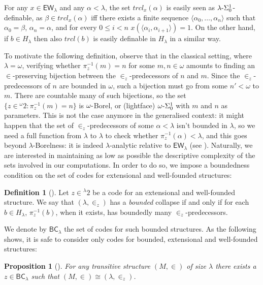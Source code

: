 \documentclass{amsart}
\numberwithin{equation}{section}
\def\hyp{{\hbox{-}}}
\newtheorem{proposition}[theorem]{Proposition}
\theoremstyle{definition}
\newtheorem{definition}[theorem]{Definition}
\theoremstyle{remark}
\begin{document}
For any $x\in\mathsf{EW}_\lambda$ and any $\alpha<\lambda$, the set $trcl_x(\alpha)$ is easily seen as $\lambda\hyp\Sigma^1_0$-definable, as $\beta\in trcl_x(\alpha)$ iff there exists a finite sequence $\langle\alpha_0,\dots,\alpha_n\rangle$ such that $\alpha_0=\beta$, $\alpha_n=\alpha$, and for every $0\leq i<n$ $x(\langle\alpha_i,\alpha_{i+1}\rangle)=1$. On the other hand, if $b\in H_\lambda$ then also $trcl(b)$ is easily definable in $H_\lambda$ in a similar way. 

To motivate the following definition, observe that in the classical setting, where $\lambda = \omega$, verifying whether $\pi^{-1}_z(m) = n$ for some $m,n \in \omega$ amounts to finding an $\in$-preserving bijection between the $\in_z$-predecessors of $n$ and $m$. Since the $\in_z$-predecessors of $n$ are bounded in $\omega$, such a bijection must go from some $n'<\omega$ to $m$. There are countable many of such bijections, so the set $\{z\in{}^{\omega}2:\pi_{z}^{-1}(m)=n\}$ is $\omega\hyp$Borel, or (lightface) $\omega\hyp\Sigma^1_0$ with $m$ and $n$ as parameters. This is not the case anymore in the generalised context: it might happen that the set of $\in_{z}$-predecessors of some $\alpha<\lambda$ isn't bounded in $\lambda$, so we need a full function from $\lambda$ to $\lambda$ to check whether $\pi^{-1}_{z}(\alpha)<\lambda$, and this goes beyond $\lambda$-Borelness: it is indeed $\lambda$-analytic relative to $\mathsf{EW}_\lambda$ (see \cite[Lemma 7.2.4]{DMR}). Naturally, we are interested in maintaining as low as possible the descriptive complexity of the sets involved in our computations. In order to do so, we impose a boundedness condition on the set of codes for extensional and well-founded structures:

\begin{definition}[{\cite[Definition 7.2.5]{DMR}}]
	Let $z\in{}^{\lambda}2$ be a code for an extensional and well-founded structure. We say that $(\lambda,\in_{z})$ has a \emph{bounded} collapse if and only if for each $b\in H_{\lambda}$, $\pi^{-1}_{z}(b)$, when it exists, has boundedly many $\in_{z}$-predecessors.%
\end{definition}

We denote by $\mathsf{BC}_{\lambda}$ the set of codes for such bounded structures. As the following shows, it is safe to consider only codes for bounded, extensional and well-founded structures:

\begin{proposition}[{\cite[Lemma 7.2.7]{DMR}}] For any transitive structure $(M,\in)$ of size $\lambda$ there exists a $z\in\mathsf{BC}_{\lambda}$ such that $(M,\in)\cong(\lambda,\in_{z})$. 
\end{proposition}
\end{document}
